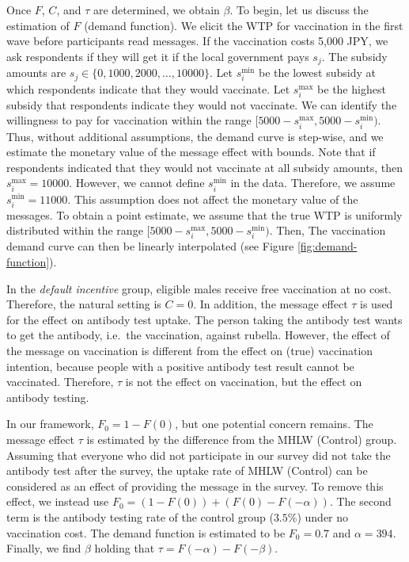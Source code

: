 \documentclass[
]{article}
\begin{document}
Once \(F\), \(C\), and \(\tau\) are determined, we obtain \(\beta\). To begin, let us discuss the estimation of \(F\) (demand function). We elicit the WTP for vaccination in the first wave before participants read messages. If the vaccination costs 5,000 JPY, we ask respondents if they will get it if the local government pays \(s_j\). The subsidy amounts are \(s_j \in \{0, 1000, 2000, \ldots , 10000\}\). Let \(s_i^{\text{min}}\) be the lowest subsidy at which respondents indicate that they would vaccinate. Let \(s_i^{\text{max}}\) be the highest subsidy that respondents indicate they would not vaccinate. We can identify the willingness to pay for vaccination within the range \([5000 - s_i^{\text{max}}, 5000 - s_i^{\text{min}})\). Thus, without additional assumptions, the demand curve is step-wise, and we estimate the monetary value of the message effect with bounds. Note that if respondents indicated that they would not vaccinate at all subsidy amounts, then \(s_i^{\text{max}} = 10000\). However, we cannot define \(s_i^{\text{min}}\) in the data. Therefore, we assume \(s_i^{\text{min}} = 11000\). This assumption does not affect the monetary value of the messages. To obtain a point estimate, we assume that the true WTP is uniformly distributed within the range \([5000 - s_i^{\text{max}}, 5000 - s_i^{\text{min}})\). Then, The vaccination demand curve can then be linearly interpolated (see Figure \ref{fig:demand-function}).

In the \emph{default incentive} group, eligible males receive free vaccination at no cost. Therefore, the natural setting is \(C=0\). In addition, the message effect \(\tau\) is used for the effect on antibody test uptake. The person taking the antibody test wants to get the antibody, i.e.~the vaccination, against rubella. However, the effect of the message on vaccination is different from the effect on (true) vaccination intention, because people with a positive antibody test result cannot be vaccinated. Therefore, \(\tau\) is not the effect on vaccination, but the effect on antibody testing.

In our framework, \(F_0=1-F(0)\), but one potential concern remains. The message effect \(\tau\) is estimated by the difference from the MHLW (Control) group. Assuming that everyone who did not participate in our survey did not take the antibody test after the survey, the uptake rate of MHLW (Control) can be considered as an effect of providing the message in the survey. To remove this effect, we instead use \(F_0=(1-F(0))+(F(0)-F(-\alpha))\). The second term is the antibody testing rate of the control group (\(3.5\)\%) under no vaccination cost. The demand function is estimated to be \(F_0=0.7\) and \(\alpha=394\). Finally, we find \(\beta\) holding that \(\tau=F(-\alpha)-F(-\beta)\).
\end{document}
